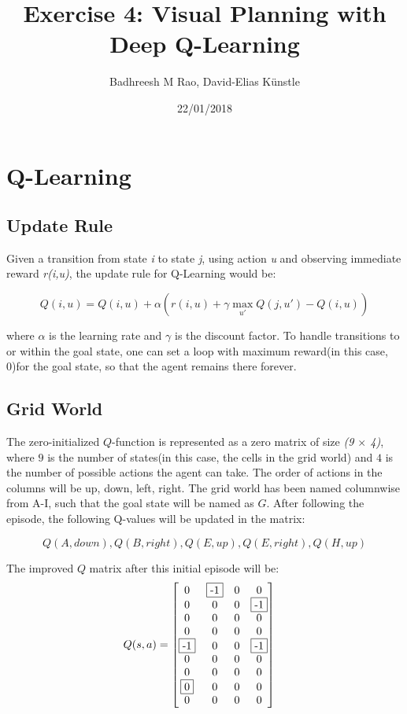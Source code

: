 \documentclass[a4paper,14pt]{article}
\begin{document}
\title{Exercise 4: Visual Planning with Deep Q-Learning}
\author{Badhreesh M Rao, David-Elias K\"unstle}
\date{22/01/2018}
\maketitle
\section{Q-Learning}\label{sec:q-learning}
\subsection{Update Rule}\label{sec:update-rule}
Given a transition from state \textit{i} to state \textit{j}, using action \textit{u} and
observing immediate reward \textit{r(i,u)}, the update rule for Q-Learning would be:

\begin{equation*}
 Q(i,u) = Q(i,u) + \alpha(r(i,u) + \gamma\max_{u'}Q(j,u') - Q(i,u))
\end{equation*} 

where $\alpha$ is the learning rate and $\gamma$ is the discount factor. To handle transitions
to or within the goal state, one can set a loop with maximum reward(in this case, 0)for the goal
state, so that the agent remains there forever.
\subsection{Grid World}\label{sec:grid-world}
The zero-initialized $Q$-function is represented as a zero matrix of size \textit{(9 $\times$ 4)}, 
where $9$ is the number of states(in this case, the cells in the grid world) and $4$ is the
number of possible actions the agent can take. The order of actions in the columns will be up, down, left, right.
The grid world has been named columnwise from A-I, such that the goal state will be named as $G$. After following
the episode, the following Q-values will be updated in the matrix:

\begin{equation*}
 Q(A,down), Q(B,right), Q(E,up), Q(E,right), Q(H,up)
\end{equation*}

The improved $Q$ matrix after this initial episode will be:
$$
Q(s,a)
=
\begin{bmatrix}
0&\fbox{-1}&0&0\\
0&0&0&\fbox{-1}\\
0&0&0&0\\
0&0&0&0\\
\fbox{-1}&0&0&\fbox{-1}\\
0&0&0&0\\
0&0&0&0\\
\fbox{0}&0&0&0\\
0&0&0&0\\
\end{bmatrix}
\quad
$$
\end{document}
